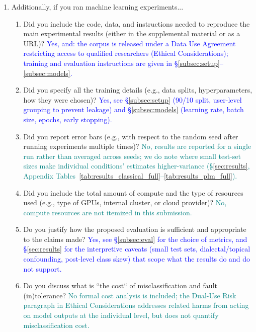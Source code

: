 \documentclass[letterpaper]{article} %
\newcommand{\answerYes}[1]{\textcolor{blue}{#1}}
\newcommand{\answerNo}[1]{\textcolor{teal}{#1}}
\begin{document}
\begin{enumerate}
\item Additionally, if you ran machine learning experiments...
\begin{enumerate}
  \item Did you include the code, data, and instructions needed to reproduce the main experimental results (either in the supplemental material or as a URL)?
    \answerYes{Yes, and: the corpus is released under a Data Use Agreement restricting access to qualified researchers (Ethical Considerations); training and evaluation instructions are given in \S\ref{subsec:setup}--\ref{subsec:models}.}
  \item Did you specify all the training details (e.g., data splits, hyperparameters, how they were chosen)?
    \answerYes{Yes, see \S\ref{subsec:setup} (90/10 split, user-level grouping to prevent leakage) and \S\ref{subsec:models} (learning rate, batch size, epochs, early stopping).}
     \item Did you report error bars (e.g., with respect to the random seed after running experiments multiple times)?
    \answerNo{No, results are reported for a single run rather than averaged across seeds; we do note where small test-set sizes make individual conditions' estimates higher-variance (\S\ref{sec:results}, Appendix Tables~\ref{tab:results_classical_full}--\ref{tab:results_plm_full}).}
	\item Did you include the total amount of compute and the type of resources used (e.g., type of GPUs, internal cluster, or cloud provider)?
    \answerNo{No, compute resources are not itemized in this submission.}
     \item Do you justify how the proposed evaluation is sufficient and appropriate to the claims made?
    \answerYes{Yes, see \S\ref{subsec:eval} for the choice of metrics, and \S\ref{sec:results} for the interpretive caveats (small test sets, dialectal/topical confounding, post-level class skew) that scope what the results do and do not support.}
     \item Do you discuss what is ``the cost`` of misclassification and fault (in)tolerance?
    \answerNo{No formal cost analysis is included; the Dual-Use Risk paragraph in Ethical Considerations addresses related harms from acting on model outputs at the individual level, but does not quantify misclassification cost.}

\end{enumerate}


\end{enumerate}
\end{document}
